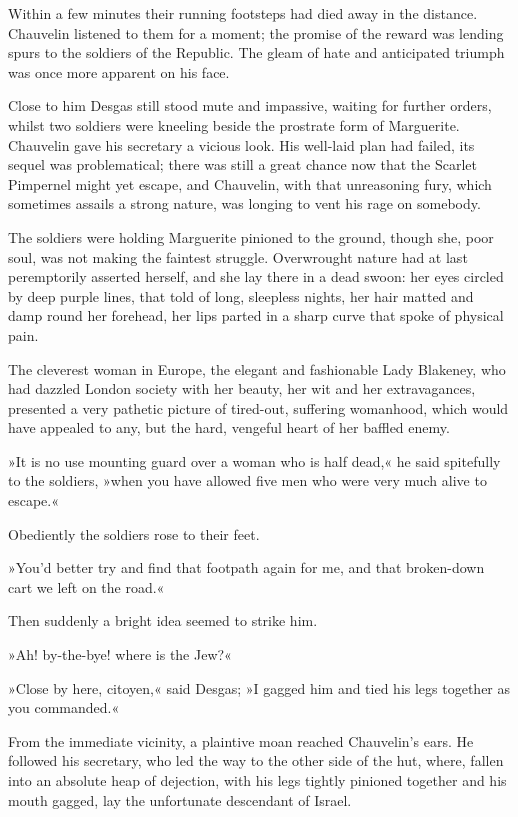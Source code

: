 Within a few minutes their running footsteps had died away in the distance. Chauvelin listened to them for a moment; the promise of the reward was lending spurs to the soldiers of the Republic. The gleam of hate and anticipated triumph was once more apparent on his face.

Close to him Desgas still stood mute and impassive, waiting for further orders, whilst two soldiers were kneeling beside the prostrate form of Marguerite. Chauvelin gave his secretary a vicious look. His well-laid plan had failed, its sequel was problematical; there was still a great chance now that the Scarlet Pimpernel might yet escape, and Chauvelin, with that unreasoning fury, which sometimes assails a strong nature, was longing to vent his rage on somebody.

The soldiers were holding Marguerite pinioned to the ground, though she, poor soul, was not making the faintest struggle. Overwrought nature had at last peremptorily asserted herself, and she lay there in a dead swoon: her eyes circled by deep purple lines, that told of long, sleepless nights, her hair matted and damp round her forehead, her lips parted in a sharp curve that spoke of physical pain.

The cleverest woman in Europe, the elegant and fashionable Lady Blakeney, who had dazzled London society with her beauty, her wit and her extravagances, presented a very pathetic picture of tired-out, suffering womanhood, which would have appealed to any, but the hard, vengeful heart of her baffled enemy.

»It is no use mounting guard over a woman who is half dead,« he said spitefully to the soldiers, »when you have allowed five men who were very much alive to escape.«

Obediently the soldiers rose to their feet.

»You'd better try and find that footpath again for me, and that broken-down cart we left on the road.«

Then suddenly a bright idea seemed to strike him.

»Ah! by-the-bye! where is the Jew?«

»Close by here, citoyen,« said Desgas; »I gagged him and tied his legs together as you commanded.«

From the immediate vicinity, a plaintive moan reached Chauvelin's ears. He followed his secretary, who led the way to the other side of the hut, where, fallen into an absolute heap of dejection, with his legs tightly pinioned together and his mouth gagged, lay the unfortunate descendant of Israel.

